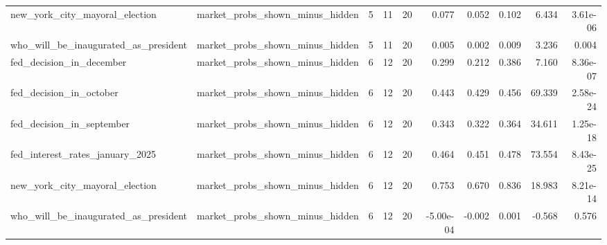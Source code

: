 \begin{longtable}{llrrrrrrrr}
new\_york\_city\_mayoral\_election & market\_probs\_shown\_minus\_hidden & 5 & 11 & 20 & 0.077 & 0.052 & 0.102 & 6.434 & 3.61e-06 \\
who\_will\_be\_inaugurated\_as\_president & market\_probs\_shown\_minus\_hidden & 5 & 11 & 20 & 0.005 & 0.002 & 0.009 & 3.236 & 0.004 \\
fed\_decision\_in\_december & market\_probs\_shown\_minus\_hidden & 6 & 12 & 20 & 0.299 & 0.212 & 0.386 & 7.160 & 8.36e-07 \\
fed\_decision\_in\_october & market\_probs\_shown\_minus\_hidden & 6 & 12 & 20 & 0.443 & 0.429 & 0.456 & 69.339 & 2.58e-24 \\
fed\_decision\_in\_september & market\_probs\_shown\_minus\_hidden & 6 & 12 & 20 & 0.343 & 0.322 & 0.364 & 34.611 & 1.25e-18 \\
fed\_interest\_rates\_january\_2025 & market\_probs\_shown\_minus\_hidden & 6 & 12 & 20 & 0.464 & 0.451 & 0.478 & 73.554 & 8.43e-25 \\
new\_york\_city\_mayoral\_election & market\_probs\_shown\_minus\_hidden & 6 & 12 & 20 & 0.753 & 0.670 & 0.836 & 18.983 & 8.21e-14 \\
who\_will\_be\_inaugurated\_as\_president & market\_probs\_shown\_minus\_hidden & 6 & 12 & 20 & -5.00e-04 & -0.002 & 0.001 & -0.568 & 0.576 \\
\end{longtable}
\normalsize

